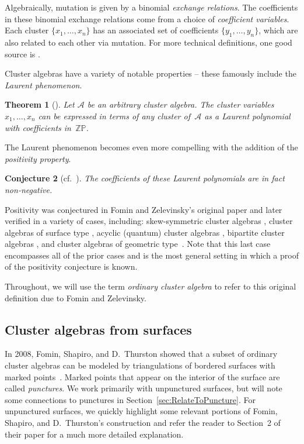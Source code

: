 \documentclass[11pt]{article}
\numberwithin{equation}{section}
\newtheorem{Theorem}{Theorem}[section]
\newtheorem{Conjecture}[Theorem]{Conjecture}
 { \theoremstyle{definition}
\newtheorem{Definition}[Theorem]{Definition}
\newtheorem{Example}[Theorem]{Example}
\newtheorem{Remark}[Theorem]{Remark} }
\begin{document}
Algebraically, mutation is given by a binomial \emph{exchange relations}. The coefficients in these binomial exchange relations come from a choice of \emph{coefficient variables}. Each cluster $\{ x_1, \dots, x_n \}$ has an associated set of coefficients $\{y_1, \dots, y_n \}$, which are also related to each other via mutation. For more technical definitions, one good source is \cite[Section~2]{Fomin-Zelevinsky-IV}.

Cluster algebras have a variety of notable properties -- these famously include the \emph{Laurent phenomenon}.

\begin{Theorem}[{\cite[Theorem 3.1]{Fomin-Zelevinsky-I}}]
Let $\mathcal{A}$ be an arbitrary cluster algebra. The cluster variables $x_1, \dots, x_n$ can be expressed in terms of any cluster of~$\mathcal{A}$ as a Laurent polynomial with coefficients in~$\mathbb{ZP}$.
\end{Theorem}

The Laurent phenomenon becomes even more compelling with the addition of the \emph{positivity property}.

\begin{Conjecture}[{cf.\ \cite[Section 3]{Fomin-Zelevinsky-I}}]
The coefficients of these Laurent polynomials are in fact \emph{non-negative}.
\end{Conjecture}

Positivity was conjectured in Fomin and Zelevinsky's original paper \cite{Fomin-Zelevinsky-I} and later verified in a variety of cases, including: skew-symmetric cluster algebras \cite{Lee-Schiffler}, cluster algebras of surface type \cite{MSW, Schiffler, Schiffler-Thomas}, acyclic (quantum) cluster algebras \cite{Caldero-Reineke, Efimov,Kimura-Qin, Qin}, bipartite cluster algebras \cite{Nakajima}, and cluster algebras of geometric type~\cite{GHKK}. Note that this last case encompasses all of the prior cases and is the most general setting in which a proof of the positivity conjecture is known.

Throughout, we will use the term \emph{ordinary cluster algebra} to refer to this original definition due to Fomin and Zelevinsky.

\subsection{Cluster algebras from surfaces}

In 2008, Fomin, Shapiro, and D.~Thurston showed that a subset of ordinary cluster algebras can be modeled by triangulations of bordered surfaces with marked points~\cite{FST-triangulatedSurfaces}. Marked points that appear on the interior of the surface are called \emph{punctures}. We work primarily with unpunctured surfaces, but will note some connections to punctures in Section~\ref{sec:RelateToPuncture}. For unpunctured surfaces, we quickly highlight some relevant portions of Fomin, Shapiro, and D.~Thurston's construction and refer the reader to Section~2 of their paper for a much more detailed explanation.
\end{document}
